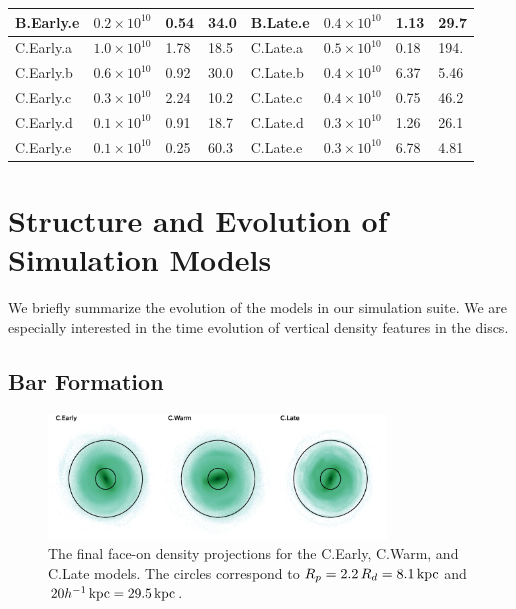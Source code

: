 \begin{table}
\begin{tabular}{|l l l l | l l l l|}
	B.Early.e & $0.2 \times 10^{10}$ & 0.54 & 34.0 & B.Late.e & $0.4 \times 10^{10}$ & 1.13 & 29.7 \\
	\hline
    C.Early.a & $1.0 \times 10^{10}$ & 1.78 & 18.5 & C.Late.a & $0.5 \times 10^{10}$ & 0.18 & 194. \\
	C.Early.b & $0.6 \times 10^{10}$ & 0.92 & 30.0 & C.Late.b & $0.4 \times 10^{10}$ & 6.37 & 5.46 \\
	C.Early.c & $0.3 \times 10^{10}$ & 2.24 & 10.2 & C.Late.c & $0.4 \times 10^{10}$ & 0.75 & 46.2 \\
	C.Early.d & $0.1 \times 10^{10}$ & 0.91 & 18.7 & C.Late.d & $0.3 \times 10^{10}$ & 1.26 & 26.1 \\
	C.Early.e & $0.1 \times 10^{10}$ & 0.25 & 60.3 & C.Late.e & $0.3 \times 10^{10}$ & 6.78 & 4.81 \\
	\hline
	\end{tabular}
\end{table}



\section{Structure and Evolution of Simulation Models} \label{sec:evolution}

We briefly summarize the evolution of the models in our simulation suite. We are especially interested in the time evolution of vertical density features in the discs.



\subsection{Bar Formation}


\begin{figure}
    \centering
	\includegraphics[width=0.8\textwidth]{../figures/three_panel_densities.eps} \caption{The final face-on density projections for the C.Early, C.Warm, and C.Late models. The circles correspond to $R_p = 2.2\, R_d = 8.1 \,\text{kpc}$ and $20 h^{-1} \, \text{kpc} = 29.5 \, \text{kpc}$.}
	\label{fig:final_densities}
\end{figure}

